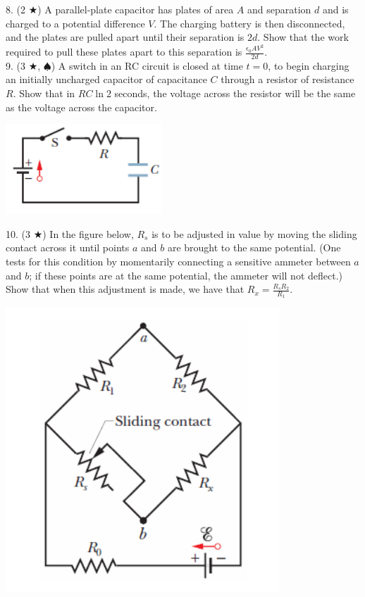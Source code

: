 8. (2 $\bigstar$) A parallel-plate capacitor has plates of area $A$ and separation $d$ and is charged to a potential difference $V$. The charging battery is then disconnected, and the plates are pulled apart until their separation is $2d$. Show that the work required to pull these plates apart to this separation is $\frac{\epsilon_0AV^2}{2d}$.\\
9. (3 $\bigstar$, $\spadesuit$) A switch in an RC circuit is closed at time $t=0$, to begin charging an initially uncharged capacitor of capacitance $C$ through a resistor of resistance $R$. Show that in $RC \ln 2$ seconds, the voltage across the resistor will be the same as the voltage across the capacitor.\\
\begin{center}
	\includegraphics[scale=0.7]{images/em/RC-problem1.png}
\end{center}
10. (3 $\bigstar$) In the figure below, $R_s$ is to be adjusted in value by moving the sliding contact across it until points $a$ and $b$ are brought to the same potential. (One tests for this condition by momentarily connecting a sensitive ammeter between $a$ and $b$; if these points are at the same potential, the ammeter will not deflect.) Show that when this adjustment is made, we have that $R_x = \frac{R_sR_2}{R_1}$. \\
\begin{center}
	\includegraphics[scale=0.7]{images/em/circuit-problem1.png}
\end{center}
